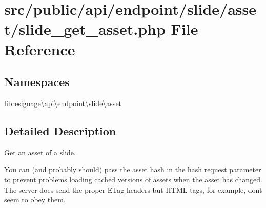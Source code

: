 \hypertarget{src_2public_2api_2endpoint_2slide_2asset_2slide__get__asset_8php}{}\section{src/public/api/endpoint/slide/asset/slide\+\_\+get\+\_\+asset.php File Reference}
\label{src_2public_2api_2endpoint_2slide_2asset_2slide__get__asset_8php}
\subsection*{Namespaces}
\begin{DoxyCompactItemize}
\item 
 \hyperlink{namespacelibresignage_1_1api_1_1endpoint_1_1slide_1_1asset}{libresignage\textbackslash{}api\textbackslash{}endpoint\textbackslash{}slide\textbackslash{}asset}
\end{DoxyCompactItemize}


\subsection{Detailed Description}
Get an asset of a slide.

You can (and probably should) pass the asset hash in the \textquotesingle{}hash\textquotesingle{} request parameter to prevent problems loading cached versions of assets when the asset has changed. The server does send the proper E\+Tag headers but H\+T\+ML  tags, for example, don\textquotesingle{}t seem to obey them.

